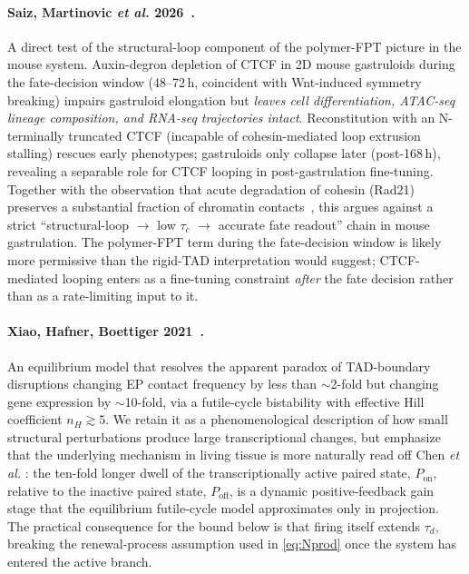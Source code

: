 \documentclass[11pt]{article}
\begin{document}
\paragraph{Saiz, Martinovic \textit{et al.} 2026~\cite{Saiz2026}.} A direct
test of the structural-loop component of the polymer-FPT picture in the
mouse system. Auxin-degron depletion of CTCF in 2D mouse gastruloids
during the fate-decision window (48--72\,h, coincident with Wnt-induced
symmetry breaking) impairs gastruloid elongation but \emph{leaves cell
differentiation, ATAC-seq lineage composition, and RNA-seq trajectories
intact}. Reconstitution with an N-terminally truncated CTCF (incapable of
cohesin-mediated loop extrusion stalling) rescues early phenotypes;
gastruloids only collapse later (post-168\,h), revealing a separable role
for CTCF looping in post-gastrulation fine-tuning. Together with the
observation that acute degradation of cohesin (Rad21) preserves a
substantial fraction of chromatin
contacts~\cite{Rao2017,Schwarzer2017,Hsieh2022}, this argues against a
strict ``structural-loop $\to$ low $\tau_c$ $\to$ accurate fate readout''
chain in mouse gastrulation. The polymer-FPT term during the fate-decision
window is likely more permissive than the rigid-TAD interpretation would
suggest; CTCF-mediated looping enters as a fine-tuning constraint
\emph{after} the fate decision rather than as a rate-limiting input to it.

\paragraph{Xiao, Hafner, Boettiger 2021~\cite{Xiao2021}.} An equilibrium
model that resolves the apparent paradox of TAD-boundary disruptions
changing EP contact frequency by less than $\sim$2-fold but changing gene
expression by $\sim$10-fold, via a futile-cycle bistability with
effective Hill coefficient $n_H\!\gtrsim\!5$. We retain it as a
phenomenological description of how small structural perturbations
produce large transcriptional changes, but emphasize that the underlying
mechanism in living tissue is more naturally read off Chen \textit{et al.}
\cite{Chen2018}: the ten-fold longer dwell of the transcriptionally
active paired state, $P_{\mathrm{on}}$, relative to the inactive paired
state, $P_{\mathrm{off}}$, is a dynamic positive-feedback gain stage that
the equilibrium futile-cycle model approximates only in projection. The
practical consequence for the bound below is that firing itself extends
$\tau_d$, breaking the renewal-process assumption used in
\eqref{eq:Nprod} once the system has entered the active branch.
\end{document}
